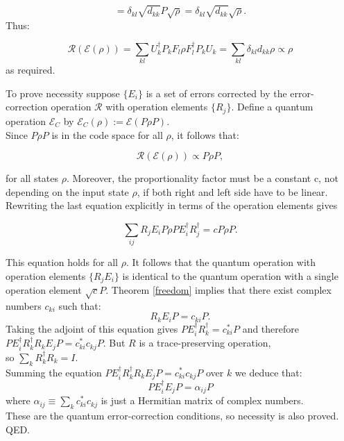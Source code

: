 \documentclass{article}
\begin{document}
\begin{equation}
	\label{conditionauxilary}
	= \delta_{kl} \sqrt{d_{kk}} P \sqrt{\rho} = \delta_{kl} \sqrt{d_{kk}} \sqrt{\rho}.
\end{equation}
Thus:

\begin{equation}
	\mathcal{R}(\mathcal{E}(\rho)) = \sum_{kl} U_k^\dagger P_k F_l \rho F_l^\dagger P_k U_k = \sum_{kl} \delta_{kl} d_{kk} \rho \propto \rho
\end{equation}
as required.\\
\vspace{20pt}

\noindent To prove necessity suppose $\{E_i\}$ is a set of errors corrected by the error-correction
operation $\mathcal{R}$ with operation elements $\{R_j\}$.
Define a quantum operation $\mathcal{E}_C$ by $\mathcal{E}_C(\rho) := \mathcal{E}(P \rho P)$. \\
Since $P \rho P$ is in the code space for all $\rho$, it follows that:

\begin{equation}
	\mathcal{R}(\mathcal{E}(\rho)) \propto P \rho P,
\end{equation}

\noindent for all states $\rho$. Moreover, the proportionality factor must be a constant c, not
depending on the input state $\rho$, if both right and left side have to be linear.
Rewriting the last equation explicitly in terms of the operation elements gives

\begin{equation}
	\sum_{ij} R_j E_i P \rho P E_i^\dagger R_j^\dagger = cP \rho P.
\end{equation}

\noindent This equation holds for all $\rho$. It follows that the quantum operation with operation
elements $\{R_jE_i\}$ is identical to the quantum operation with a single operation element
$\sqrt{c}P$. Theorem \ref{freedom} implies that there exist complex numbers
$c_{ki}$ such that:
\begin{equation}
	R_k E_i P = c_{ki} P.
\end{equation}
Taking the adjoint of this equation gives $P E_i^\dagger R_k^\dagger = c_{ki}^* P$ and therefore\\
$P E_i^\dagger R_k^\dagger R_k E_j P =
	c_{ki}^* c_{kj} P$.
But $R$ is a trace-preserving operation,\\
so $\sum_k R_k^\dagger R_k = I$. \\ Summing the equation $P E_i^\dagger R_k^\dagger R_k E_j P = c_{ki}^* c_{kj} P$
over $k$ we deduce that:
\begin{equation}
	P E_i^\dagger E_j P = \alpha_{ij} P
\end{equation}
where $\alpha_{ij} \equiv \sum_k c_{ki}^* c_{kj}$ is just a Hermitian matrix of complex numbers.\\
These are the quantum error-correction conditions, so necessity is also proved.
QED.
\end{document}
